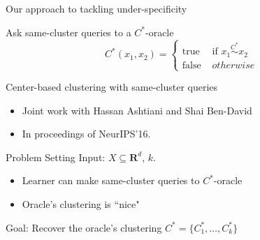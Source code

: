 \documentclass{beamer}
\newcommand{\mb}{\mathbf}
\begin{document}
\begin{frame}{Our approach to tackling under-specificity}
	

    \vspace{20pt}Ask {\color{blue}same-cluster queries} to a $C^*$-oracle\\
    $$C^*(x_1, x_2) = \left\{
	\begin{array}{ll}
		\mbox{true }  & \mbox{if } x_1 \overset{C^*}{\sim} x_2   \\
		\mbox{false } & otherwise 
	\end{array}
\right. $$
\end{frame}

\begin{frame}{Center-based clustering with same-cluster queries}
	\begin{itemize}
		\item Joint work with Hassan Ashtiani and Shai Ben-David
		\vspace{20pt} \item In proceedings of \alert{NeurIPS'16}.
	\end{itemize}
\end{frame}

\begin{frame}{Problem Setting}
	Input: $X \subseteq \mb R^d$, $k$.
	\begin{itemize} 
   		\vspace{10pt}\item Learner can make same-cluster queries to $C^*$-oracle
		\vspace{10pt}\item Oracle's clustering is ``nice"
	\end{itemize}
	\vspace{30pt} {\color{blue}Goal}: Recover the oracle's clustering $C^* = \{C_1^*, \ldots, C_k^*\}$
\end{frame}
\end{document}

